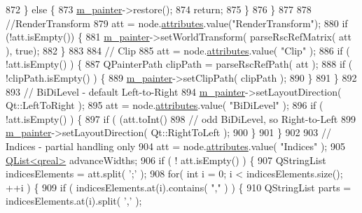 \begin{DoxyCode}
872         \} \textcolor{keywordflow}{else} \{
873             \hyperlink{classXpsHandler_a2db77df5312274e6f1d7e274b45c9d21}{m\_painter}->restore();
874             \textcolor{keywordflow}{return};
875         \}
876     \}
877 
878     \textcolor{comment}{//RenderTransform}
879     att = node.\hyperlink{classXpsRenderNode_a7f6fca2e06dd119e7eb20139af6c8477}{attributes}.value(\textcolor{stringliteral}{"RenderTransform"});
880     \textcolor{keywordflow}{if} (!att.isEmpty()) \{
881         \hyperlink{classXpsHandler_a2db77df5312274e6f1d7e274b45c9d21}{m\_painter}->setWorldTransform( parseRscRefMatrix( att ), \textcolor{keyword}{true});
882     \}
883 
884     \textcolor{comment}{// Clip}
885     att = node.\hyperlink{classXpsRenderNode_a7f6fca2e06dd119e7eb20139af6c8477}{attributes}.value( \textcolor{stringliteral}{"Clip"} );
886     \textcolor{keywordflow}{if} ( !att.isEmpty() ) \{
887         QPainterPath clipPath = parseRscRefPath( att );
888         \textcolor{keywordflow}{if} ( !clipPath.isEmpty() ) \{
889             \hyperlink{classXpsHandler_a2db77df5312274e6f1d7e274b45c9d21}{m\_painter}->setClipPath( clipPath );
890         \}
891     \}
892 
893     \textcolor{comment}{// BiDiLevel - default Left-to-Right}
894     \hyperlink{classXpsHandler_a2db77df5312274e6f1d7e274b45c9d21}{m\_painter}->setLayoutDirection( Qt::LeftToRight );
895     att = node.\hyperlink{classXpsRenderNode_a7f6fca2e06dd119e7eb20139af6c8477}{attributes}.value( \textcolor{stringliteral}{"BiDiLevel"} );
896     \textcolor{keywordflow}{if} ( !att.isEmpty() ) \{
897         \textcolor{keywordflow}{if} ( (att.toInt() %
898             \textcolor{comment}{// odd BiDiLevel, so Right-to-Left}
899             \hyperlink{classXpsHandler_a2db77df5312274e6f1d7e274b45c9d21}{m\_painter}->setLayoutDirection( Qt::RightToLeft );
900         \}
901     \}
902 
903     \textcolor{comment}{// Indices - partial handling only}
904     att = node.\hyperlink{classXpsRenderNode_a7f6fca2e06dd119e7eb20139af6c8477}{attributes}.value( \textcolor{stringliteral}{"Indices"} );
905     \hyperlink{classQList}{QList<qreal>} advanceWidths;
906     \textcolor{keywordflow}{if} ( ! att.isEmpty() ) \{
907         QStringList indicesElements = att.split( \textcolor{charliteral}{';'} );
908         \textcolor{keywordflow}{for}( \textcolor{keywordtype}{int} i = 0; i < indicesElements.size(); ++i ) \{
909             \textcolor{keywordflow}{if} ( indicesElements.at(i).contains( \textcolor{stringliteral}{","} ) ) \{
910                 QStringList parts = indicesElements.at(i).split( \textcolor{charliteral}{','} );

\end{DoxyCode}
